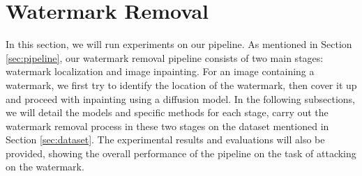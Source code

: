 



\section{Watermark Removal}
In this section, we will run experiments on our pipeline. As mentioned in Section \ref{sec:pipeline}, our watermark removal pipeline consists of two main stages: watermark localization and image inpainting. For an image containing a watermark, we first try to identify the location of the watermark, then cover it up and proceed with inpainting using a diffusion model. In the following subsections, we will detail the models and specific methods for each stage, carry out the watermark removal process in these two stages on the dataset mentioned in Section \ref{sec:dataset}. The experimental results and evaluations will also be provided, showing the overall performance of the pipeline on the task of attacking on the watermark.

